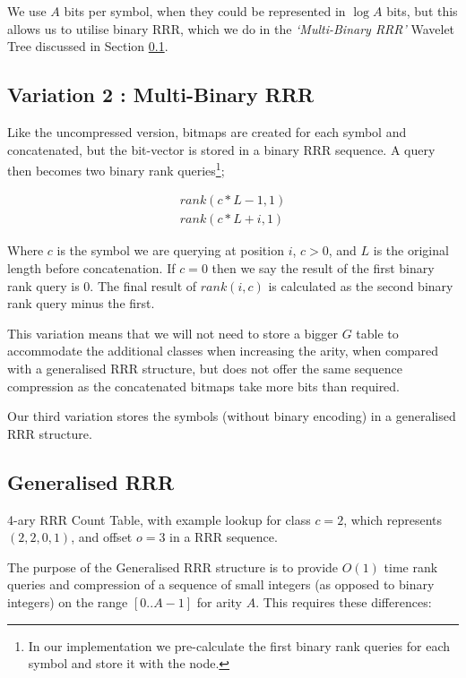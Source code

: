 We use $A$ bits per symbol, when they could be represented in $\log A$ bits, but
this allows us to utilise binary RRR, which we do in the \emph{`Multi-Binary RRR'} Wavelet Tree discussed in Section \ref{sec:multi-bin-rrr}.

\subsection{Variation 2 : Multi-Binary RRR}
\label{sec:multi-bin-rrr}
Like the uncompressed version, bitmaps are created for each symbol and 
concatenated, but the bit-vector is stored in a binary RRR sequence. A query 
then becomes two binary rank queries\footnote{In our implementation we 
pre-calculate the first binary rank queries for each symbol and store it with 
the node.};

	\begin{align}
	rank(c * L - 1, 1) \\
	rank(c * L + i, 1)
	\end{align}

Where $c$ is the symbol we are querying at position $i$,
$c > 0$, and $L$ is 
the original length before concatenation. If $c = 0$ then we say the result of 
the first binary rank query is $0$. The final result of $rank(i, c)$ is 
calculated as the second binary rank query minus the first.

This variation means that we will not need to store a bigger $G$ table to 
accommodate the additional classes when increasing the arity, when compared with
a generalised RRR structure, but does not offer the same sequence compression as
the concatenated bitmaps take more bits than required.

Our third variation stores the symbols (without binary encoding) in a 
generalised RRR structure.

\subsection{Generalised RRR}
\label{sec:gen-rrr}

	{4-ary RRR Count Table, with example lookup for class $c = 2$, 
	which represents $(2, 2, 0, 1)$, and offset $o = 3$ in a RRR
	sequence.}
	
The purpose of the Generalised RRR structure is to provide $O(1)$ time rank
queries and compression of a sequence of small integers (as opposed to binary 
integers) on the range $[0..A-1]$ for arity $A$. This requires these 
differences:

